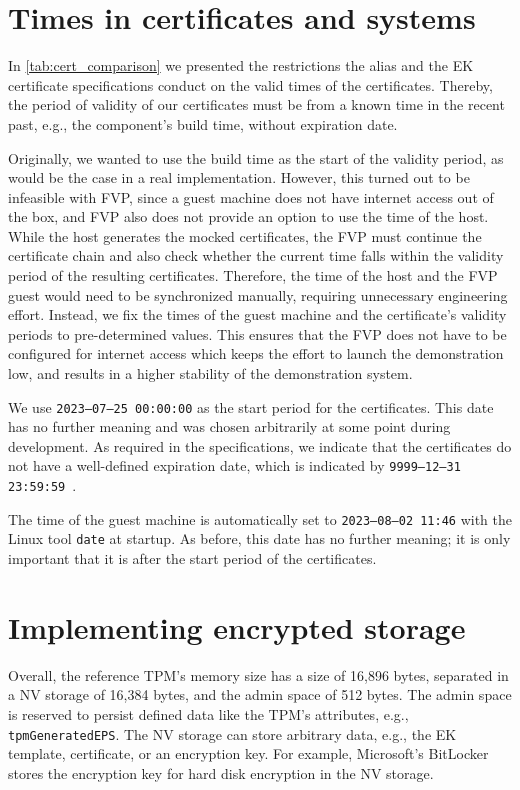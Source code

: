 \section{Times in certificates and systems}

In \autoref{tab:cert_comparison} we presented the restrictions the alias and the EK certificate specifications conduct on the valid times of the certificates.
Thereby, the period of validity of our certificates must be from a known time in the recent past, e.g., the component's build time, without expiration date.

Originally, we wanted to use the build time as the start of the validity period, as would be the case in a real implementation.
However, this turned out to be infeasible with FVP, since a guest machine does not have internet access out of the box, and FVP also does not provide an option to use the time of the host.
While the host generates the mocked certificates, the FVP must continue the certificate chain and also check whether the current time falls within the validity period of the resulting certificates.
Therefore, the time of the host and the FVP guest would need to be synchronized manually, requiring unnecessary engineering effort.
Instead, we fix the times of the guest machine and the certificate's validity periods to pre-determined values.
This ensures that the FVP does not have to be configured for internet access which keeps the effort to launch the demonstration low, and results in a higher stability of the demonstration system.

We use \texttt{2023--07--25 00:00:00} as the start period for the certificates.
This date has no further meaning and was chosen arbitrarily at some point during development.
As required in the specifications, we indicate that the certificates do not have a well-defined expiration date, which is indicated by \texttt{9999--12--31 23:59:59}~\cite{Boeyen2008}.

The time of the guest machine is automatically set to \texttt{2023--08--02 11:46} with the Linux tool \texttt{date} at startup.
As before, this date has no further meaning; it is only important that it is after the start period of the certificates.

\section{Implementing encrypted storage}

Overall, the reference TPM's memory size has a size of 16,896 bytes, separated in a NV storage of 16,384 bytes, and the admin space of 512 bytes.
The admin space is reserved to persist defined data like the TPM's attributes, e.g., \texttt{tpmGeneratedEPS}.
The NV storage can store arbitrary data, e.g., the EK template, certificate, or an encryption key.
For example, Microsoft's BitLocker stores the encryption key for hard disk encryption in the NV storage.

